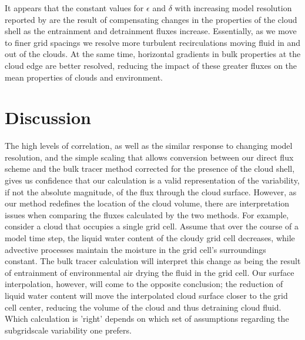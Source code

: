 \documentclass[12pt]{article}
\begin{document}
It appears that the constant values for $\epsilon$ and $\delta$ with increasing
model resolution reported by \cite{Brown1999} are the result of compensating
changes in the properties of the cloud shell as the entrainment and detrainment
fluxes increase.  Essentially, as we move to finer grid spacings we resolve
more turbulent recirculations moving fluid in and out of the clouds.  At the
same time, horizontal gradients in bulk properties at the cloud edge are better
resolved, reducing the impact of these greater fluxes on the mean properties of 
clouds and environment.


\section{Discussion}

The high levels of correlation, as well as the similar response to changing 
model resolution, and the simple scaling that allows conversion between our 
direct flux scheme and the bulk tracer method corrected for the presence of the 
cloud shell, gives us confidence that our calculation is a valid representation 
of the variability, if not the absolute magnitude, of the flux through the 
cloud surface.  However, as our method redefines the location of the cloud 
volume, there are interpretation issues when comparing the fluxes calculated by 
the two methods.  For example, consider a cloud that occupies a single grid 
cell.  Assume that over the course of a model time step, the liquid water 
content of the cloudy grid cell decreases, while advective processes maintain 
the moisture in the grid cell's surroundings constant.  The bulk tracer 
calculation will interpret this change as being the result of entrainment of 
environmental air drying the fluid in the grid cell.  Our surface 
interpolation, however, will come to the opposite conclusion; the reduction of 
liquid water content will move the interpolated cloud surface closer to the 
grid cell center, reducing the volume of the cloud and thus detraining cloud 
fluid.  Which calculation is 'right' depends on which set of assumptions 
regarding the subgridscale variability one prefers.
\end{document}
